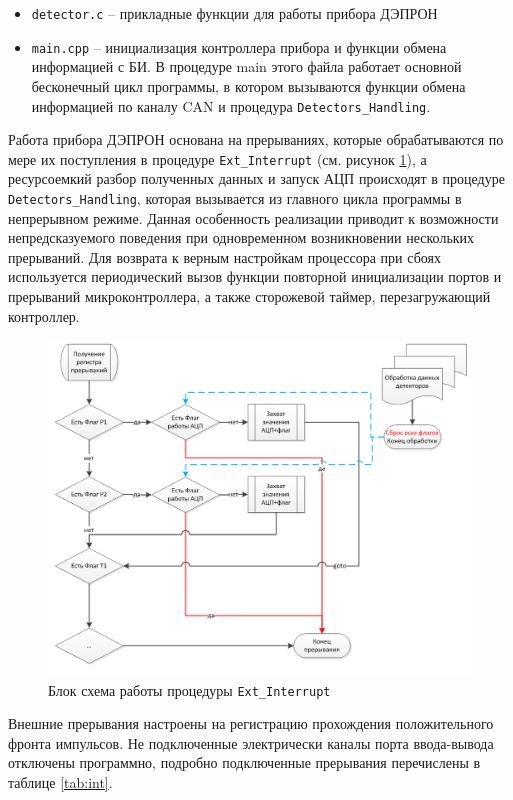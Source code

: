\begin{itemize}
	\item 	\texttt{detector.c} -- прикладные функции для работы прибора ДЭПРОН
	
	
	\item \texttt{main.cpp} -- инициализация контроллера прибора и функции обмена информацией с БИ. В процедуре main этого файла работает основной бесконечный цикл программы, в котором вызываются функции обмена информацией по каналу CAN и процедура \texttt{Detectors\_Handling}.
	
	
\end{itemize}
Работа прибора ДЭПРОН основана на прерываниях, которые обрабатываются по мере их поступления в процедуре \texttt{Ext\_Interrupt} (см. рисунок \ref{fig:ext_interrupt}), а ресурсоемкий разбор полученных данных и запуск АЦП происходят в процедуре \texttt{Detectors\_Handling}, которая вызывается из главного цикла программы в непрерывном режиме. 
Данная особенность реализации приводит к возможности непредсказуемого поведения при одновременном возникновении нескольких прерываний. 
Для возврата к верным настройкам процессора при сбоях используется периодический вызов функции повторной инициализации портов и прерываний микроконтроллера, а также сторожевой таймер, перезагружающий контроллер.
\begin{figure}
\centering
\includegraphics[width=0.7\linewidth]{images/ext_interrupt}
\caption{Блок схема работы процедуры \texttt{Ext\_Interrupt}}
\label{fig:ext_interrupt}
\end{figure}

Внешние прерывания настроены на регистрацию прохождения положительного фронта импульсов. Не подключенные электрически каналы порта ввода-вывода отключены программно, подробно подключенные прерывания перечислены в таблице \ref{tab:int}.

